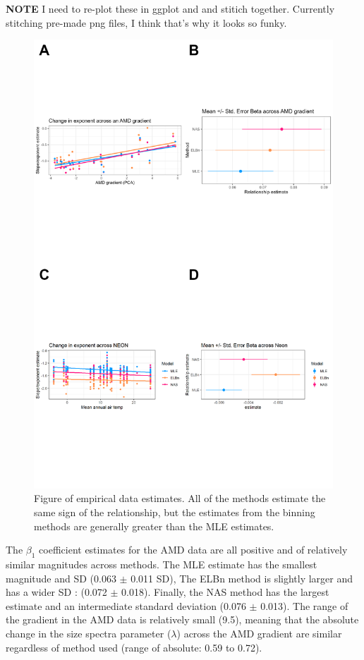 \documentclass[
]{article}
\begin{document}
\textbf{NOTE} I need to re-plot these in ggplot and and stitich
together. Currently stitching pre-made png files, I think that's why it
looks so funky.

\newpage

\begin{figure}
\centering
\includegraphics{figures/empirical_combined.png}
\caption{Figure of empirical data estimates. All of the methods estimate
the same sign of the relationship, but the estimates from the binning
methods are generally greater than the MLE estimates.}
\end{figure}

\newpage

The \(\beta_1\) coefficient estimates for the AMD data are all positive
and of relatively similar magnitudes across methods. The MLE estimate
has the smallest magnitude and SD (0.063 \(\pm\) 0.011 SD), The ELBn
method is slightly larger and has a wider SD : (0.072 \(\pm\) 0.018).
Finally, the NAS method has the largest estimate and an intermediate
standard deviation (0.076 \(\pm\) 0.013). The range of the gradient in
the AMD data is relatively small (9.5), meaning that the absolute change
in the size spectra parameter (\(\lambda\)) across the AMD gradient are
similar regardless of method used (range of absolute: 0.59 to 0.72).
\end{document}
